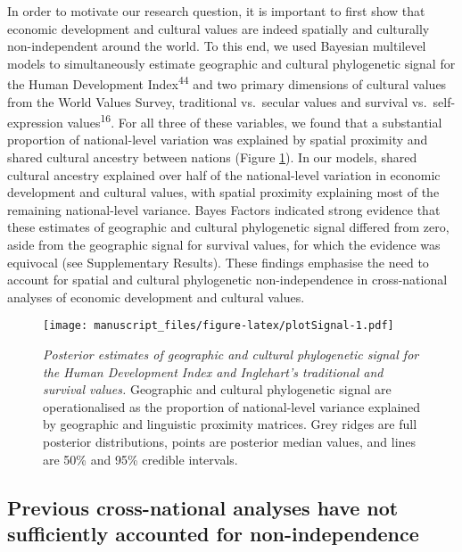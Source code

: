 \documentclass[english,man,floatsintext]{apa6}
\begin{document}
In order to motivate our research question, it is important to first show that economic development and cultural values are indeed spatially and culturally non-independent around the world. To this end, we used Bayesian multilevel models to simultaneously estimate geographic and cultural phylogenetic signal for the Human Development Index\textsuperscript{44} and two primary dimensions of cultural values from the World Values Survey, traditional vs.~secular values and survival vs.~self-expression values\textsuperscript{16}. For all three of these variables, we found that a substantial proportion of national-level variation was explained by spatial proximity and shared cultural ancestry between nations (Figure \ref{fig:plotSignal}). In our models, shared cultural ancestry explained over half of the national-level variation in economic development and cultural values, with spatial proximity explaining most of the remaining national-level variance. Bayes Factors indicated strong evidence that these estimates of geographic and cultural phylogenetic signal differed from zero, aside from the geographic signal for survival values, for which the evidence was equivocal (see Supplementary Results). These findings emphasise the need to account for spatial and cultural phylogenetic non-independence in cross-national analyses of economic development and cultural values.



\begin{figure}
\centering
\texttt{[image: manuscript\_files/figure-latex/plotSignal-1.pdf]}
\caption{\label{fig:plotSignal}\emph{Posterior estimates of geographic and cultural phylogenetic signal for the Human Development Index and Inglehart's traditional and survival values.} Geographic and cultural phylogenetic signal are operationalised as the proportion of national-level variance explained by geographic and linguistic proximity matrices. Grey ridges are full posterior distributions, points are posterior median values, and lines are 50\% and 95\% credible intervals.}
\end{figure}

\hypertarget{previous-cross-national-analyses-have-not-sufficiently-accounted-for-non-independence}{%
\subsection{Previous cross-national analyses have not sufficiently accounted for non-independence}\label{previous-cross-national-analyses-have-not-sufficiently-accounted-for-non-independence}}
\end{document}
